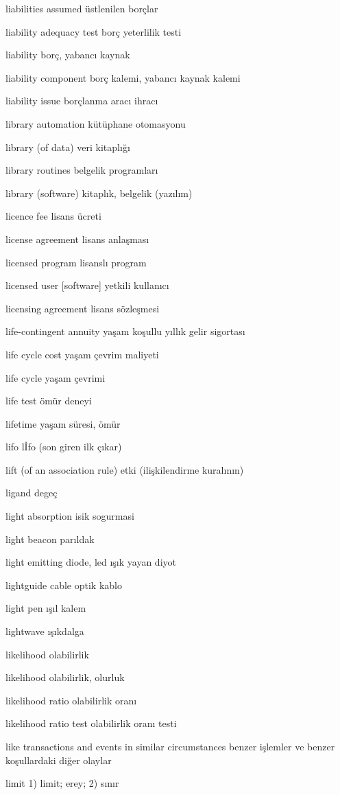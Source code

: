 \documentclass[12pt,fleqn]{article}\usepackage{../../common}
\begin{document}
liabilities assumed üstlenilen borçlar

liability adequacy test borç yeterlilik testi

liability borç, yabancı kaynak

liability component borç kalemi, yabancı kaynak kalemi

liability issue borçlanma aracı ihracı

library automation kütüphane otomasyonu

library (of data) veri kitaplığı

library routines belgelik programları

library (software) kitaplık, belgelik (yazılım)

licence fee lisans ücreti

license agreement lisans anlaşması

licensed program lisanslı program

licensed user [software] yetkili kullanıcı

licensing agreement lisans sözleşmesi

life-contingent annuity yaşam koşullu yıllık gelir sigortası

life cycle cost yaşam çevrim maliyeti

life cycle yaşam çevrimi

life test ömür deneyi

lifetime yaşam süresi, ömür

lifo lİfo (son giren ilk çıkar)

lift (of an association rule) etki (ilişkilendirme kuralının)

ligand degeç

light absorption isik sogurmasi

light beacon parıldak

light emitting diode, led ışık yayan diyot

lightguide cable optik kablo

light pen ışıl kalem

lightwave ışıkdalga

likelihood olabilirlik

likelihood olabilirlik, olurluk

likelihood ratio olabilirlik oranı

likelihood ratio test olabilirlik oranı testi

like transactions and events in similar circumstances benzer işlemler ve benzer koşullardaki diğer olaylar

limit 1) limit; erey; 2) sınır
\end{document}
